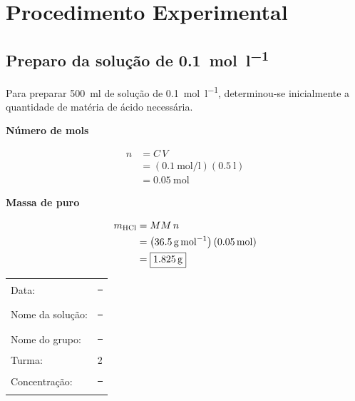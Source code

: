 \documentclass[a4paper,12pt]{article}
\newcommand{\subtitulo}[1]{%
  \par\medskip
  {\color{quadroazul}\bfseries\large #1}\par\smallskip
}
\begin{document}
\section{Procedimento Experimental}

\subsection{Preparo da solução de  \qty{0.1}{\mole\per\litre}}

Para preparar \qty{500}{\milli\litre} de solução de 
\qty{0.1}{\mole\per\litre}, determinou-se inicialmente a quantidade de matéria de ácido necessária.

\begin{minipage}[t]{0.48\textwidth}
\subtitulo{Número de mols}

\begin{align*}
  n &= C\,V \\
    &= \left(\qty{0.1}{\mole\per\litre}\right)
       \left(\qty{0.5}{\litre}\right) \\
    &= \boxed{\qty{0.05}{\mole}}
\end{align*}

\subtitulo{Massa de  puro}

\begin{align*}
  m_{\ce{HCl}} &= MM\,n \\
    &= \left(\qty{36.5}{\gram\per\mole}\right)
       \left(\qty{0.05}{\mole}\right) \\
    &= \boxed{\qty{1.825}{\gram}}
\end{align*}

\begin{tcolorbox}[
  title=Etiqueta da solução,
  colback=quadrocinza,
  colframe=black!65,
  boxrule=0.6pt,
  arc=1mm
]
\begin{tabular}{@{}ll@{}}
Data: & \rule{3.0cm}{0.4pt}\\[1.3ex]
Nome da solução: & \rule{2.2cm}{0.4pt}\\[1.3ex]
Nome do grupo: & \rule{2.5cm}{0.4pt}\\[1.3ex]
Turma: & 2\\[1.3ex]
Concentração: & \rule{2.8cm}{0.4pt}
\end{tabular}
\end{tcolorbox}
\end{minipage}
\hfill
\end{document}
